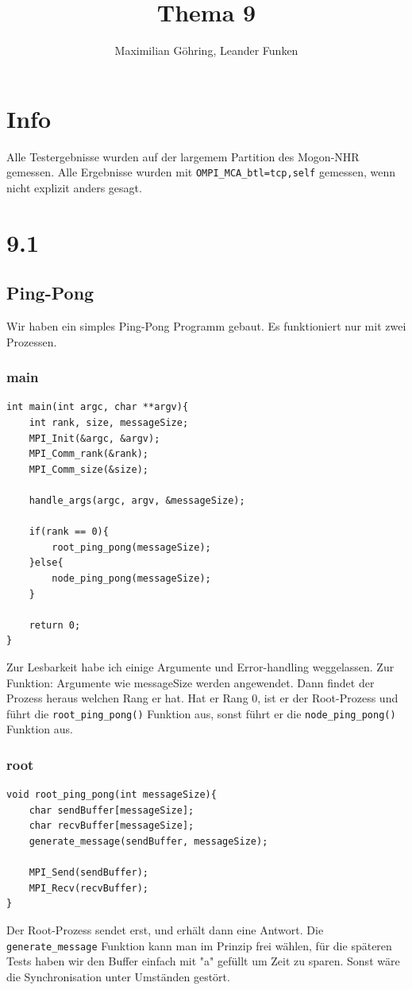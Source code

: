 \documentclass{report}
\title{Thema 9}
\author{Maximilian Göhring, Leander Funken}
\begin{document}
\maketitle

\section*{Info}
Alle Testergebnisse wurden auf der largemem Partition des Mogon-NHR gemessen.
\newline
Alle Ergebnisse wurden mit \verb|OMPI_MCA_btl=tcp,self| gemessen, wenn nicht 
explizit anders gesagt.
\newpage
\section*{9.1}
\subsection*{Ping-Pong}
Wir haben ein simples Ping-Pong Programm gebaut. Es funktioniert nur mit zwei 
Prozessen.
\subsubsection*{main}
\begin{lstlisting}
int main(int argc, char **argv){
    int rank, size, messageSize;
    MPI_Init(&argc, &argv);
    MPI_Comm_rank(&rank);
    MPI_Comm_size(&size);

    handle_args(argc, argv, &messageSize);

    if(rank == 0){
        root_ping_pong(messageSize);
    }else{
        node_ping_pong(messageSize);
    }

    return 0;
}
\end{lstlisting}
Zur Lesbarkeit habe ich einige Argumente und Error-handling weggelassen.
Zur Funktion:
Argumente wie messageSize werden angewendet. Dann findet der Prozess heraus 
welchen Rang er hat. Hat er Rang 0, ist er der Root-Prozess
und führt die \verb|root_ping_pong()| Funktion aus, sonst führt er die
\verb|node_ping_pong()| Funktion aus.
\subsubsection*{root}
\begin{lstlisting}
void root_ping_pong(int messageSize){
    char sendBuffer[messageSize];
    char recvBuffer[messageSize];
    generate_message(sendBuffer, messageSize);

    MPI_Send(sendBuffer);
    MPI_Recv(recvBuffer);
}
\end{lstlisting}
Der Root-Prozess sendet erst, und erhält dann eine Antwort. Die 
\verb|generate_message| Funktion
kann man im Prinzip frei wählen, für die späteren Tests haben wir den Buffer 
einfach mit "a" gefüllt um Zeit zu sparen.
Sonst wäre die Synchronisation unter Umständen gestört.
\end{document}
